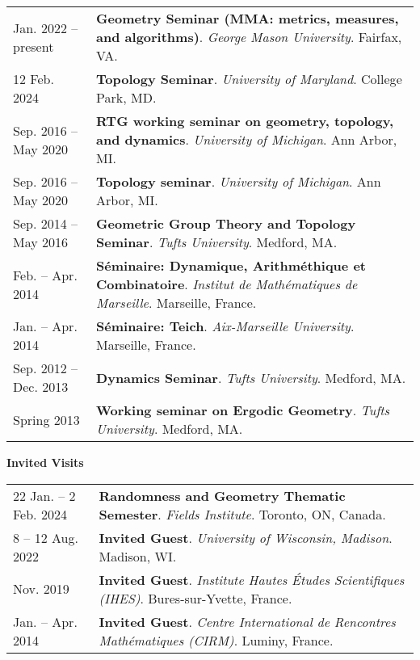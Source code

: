    \begin{center}
    {
    \renewcommand{\arraystretch}{1.5}
    \begin{longtable}{p{}  p{}}
     Jan.  2022 -- present & \textbf{Geometry Seminar (MMA: metrics, measures, and algorithms)}. \textit{George Mason University}.  Fairfax, VA.  \\ 
12 Feb.  2024 & \textbf{Topology Seminar}. \textit{University of Maryland}.  College Park, MD.  \\ 
 Sep.  2016 --  May  2020 & \textbf{RTG working seminar on geometry, topology, and dynamics}. \textit{University of Michigan}.  Ann Arbor, MI.  \\ 
 Sep.  2016 --  May  2020 & \textbf{Topology seminar}. \textit{University of Michigan}.  Ann Arbor, MI.  \\ 
 Sep.  2014 --  May  2016 & \textbf{Geometric Group Theory and Topology Seminar}. \textit{Tufts University}.  Medford, MA.  \\ 
 Feb.  --  Apr.  2014 & \textbf{S\'eminaire: Dynamique, Arithm\'ethique et Combinatoire}. \textit{Institut de Math\'ematiques de Marseille}.  Marseille, France.  \\ 
 Jan.  --  Apr.  2014 & \textbf{S\'eminaire: Teich}. \textit{Aix-Marseille University}.  Marseille, France.  \\ 
 Sep.  2012 --  Dec.  2013 & \textbf{Dynamics Seminar}. \textit{Tufts University}.  Medford, MA.  \\ 
  Spring 2013 & \textbf{Working seminar on Ergodic Geometry}. \textit{Tufts University}.  Medford, MA.  
    \end{longtable}
    } 
    \end{center}

    \vspace{-1em}
    

    \textbf{\large Invited Visits}
    
    \begin{center}
    {
    \renewcommand{\arraystretch}{1.5}
    \begin{longtable}{p{}  p{}}
    22 Jan.  -- 2 Feb.  2024 & \textbf{Randomness and Geometry Thematic Semester}. \textit{Fields Institute}.  Toronto, ON, Canada.  \\ 
8  -- 12 Aug.  2022 & \textbf{Invited Guest}. \textit{University of Wisconsin, Madison}.  Madison, WI.  \\ 
 Nov.  2019 & \textbf{Invited Guest}. \textit{Institute Hautes \'Etudes Scientifiques (IHES)}.  Bures-sur-Yvette, France.  \\ 
 Jan.  --  Apr.  2014 & \textbf{Invited Guest}. \textit{Centre International de Rencontres Math\'ematiques (CIRM)}.  Luminy, France.  
    \end{longtable}
    } 
    \end{center}

    \vspace{-1em}
    